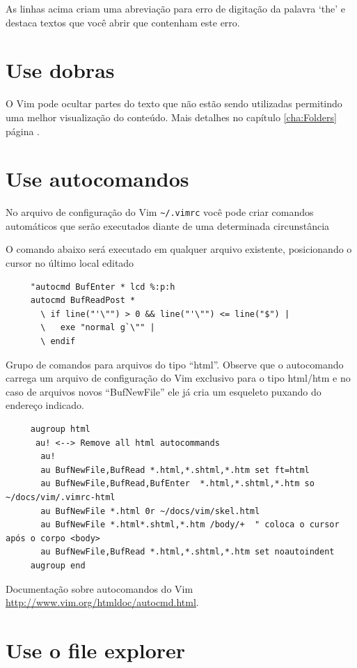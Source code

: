 \documentclass[10pt,a4paper,openany]{book}
\begin{document}
As linhas acima criam uma abreviação para erro de digitação da palavra `the'
e destaca textos que você abrir que contenham este erro.

\section{Use dobras}\label{sec:Use folders}

O Vim pode ocultar partes do texto que não estão sendo utilizadas permitindo
uma melhor visualização do conteúdo. Mais detalhes no capítulo
\ref{cha:Folders} página \pageref{cha:Folders}.

\section{Use autocomandos}
\label{Use autocomandos}

No arquivo de configuração do Vim \verb|~/.vimrc| você pode criar comandos
automáticos que serão executados diante de uma determinada
circunstância

O comando abaixo será executado em qualquer arquivo existente, posicionando o cursor no último local editado

\begin{verbatim}
     "autocmd BufEnter * lcd %:p:h
     autocmd BufReadPost *
       \ if line("'\"") > 0 && line("'\"") <= line("$") |
       \   exe "normal g`\"" |
       \ endif
\end{verbatim}


Grupo de comandos para arquivos do tipo ``html''. Observe que o
autocomando carrega um arquivo de configuração do Vim exclusivo para o
tipo html/htm e no caso de arquivos novos ``BufNewFile'' ele já cria um
esqueleto puxando do endereço indicado.

\begin{verbatim}
     augroup html
      au! <--> Remove all html autocommands
       au!
       au BufNewFile,BufRead *.html,*.shtml,*.htm set ft=html
       au BufNewFile,BufRead,BufEnter  *.html,*.shtml,*.htm so ~/docs/vim/.vimrc-html
       au BufNewFile *.html 0r ~/docs/vim/skel.html
       au BufNewFile *.html*.shtml,*.htm /body/+  " coloca o cursor após o corpo <body>
       au BufNewFile,BufRead *.html,*.shtml,*.htm set noautoindent
     augroup end
\end{verbatim}

Documentação sobre autocomandos do Vim \url{http://www.vim.org/htmldoc/autocmd.html}.

\section{Use o file explorer}\label{Use o file explorer}
\end{document}
